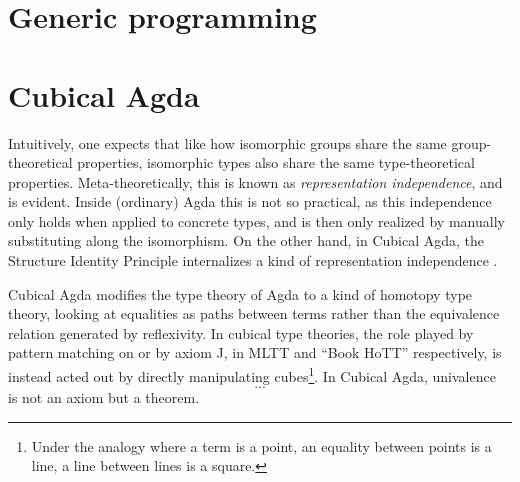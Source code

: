 \section{\changed{} Generic programming}\label{ssec:bg-desc}









\section{Cubical Agda}
Intuitively, one expects that like how isomorphic groups share the same group-theoretical properties, isomorphic types also share the same type-theoretical properties. Meta-theoretically, this is known as \emph{representation independence}, and is evident. Inside (ordinary) Agda this is not so practical, as this independence only holds when applied to concrete types, and is then only realized by manually substituting along the isomorphism. On the other hand, in Cubical Agda, the Structure Identity Principle internalizes a kind of representation independence \cite{iri}.

Cubical Agda modifies the type theory of Agda to a kind of homotopy type theory, looking at equalities as paths between terms rather than the equivalence relation generated by reflexivity. In cubical type theories, the role played by pattern matching on  or by axiom J, in MLTT and ``Book HoTT'' respectively, is instead acted out by directly manipulating cubes\footnote{Under the analogy where a term is a point, an equality between points is a line, a line between lines is a square.}. In Cubical Agda, univalence
\[ ... \]
is not an axiom but a theorem.

